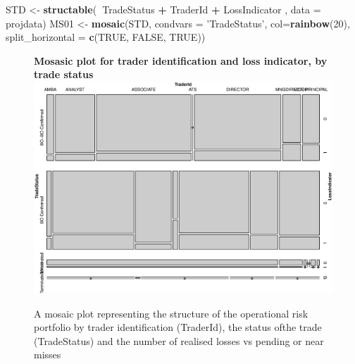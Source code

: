\documentclass[]{article}
\newenvironment{Shaded}{\begin{snugshade}}{\end{snugshade}}
\newcommand{\KeywordTok}[1]{\textcolor[rgb]{0.13,0.29,0.53}{\textbf{#1}}}
\newcommand{\DataTypeTok}[1]{\textcolor[rgb]{0.13,0.29,0.53}{#1}}
\newcommand{\DecValTok}[1]{\textcolor[rgb]{0.00,0.00,0.81}{#1}}
\newcommand{\StringTok}[1]{\textcolor[rgb]{0.31,0.60,0.02}{#1}}
\newcommand{\OtherTok}[1]{\textcolor[rgb]{0.56,0.35,0.01}{#1}}
\newcommand{\OperatorTok}[1]{\textcolor[rgb]{0.81,0.36,0.00}{\textbf{#1}}}
\newcommand{\NormalTok}[1]{#1}
\begin{document}
\begin{Shaded}
\begin{Highlighting}[]
\NormalTok{STD <-}\StringTok{ }\KeywordTok{structable}\NormalTok{(}\OperatorTok{~}\NormalTok{TradeStatus }\OperatorTok{+}\StringTok{ }\NormalTok{TraderId }\OperatorTok{+}\StringTok{ }\NormalTok{LossIndicator}
\NormalTok{                                        , }\DataTypeTok{data =}\NormalTok{ projdata)}
\NormalTok{MS01 <-}\StringTok{ }\KeywordTok{mosaic}\NormalTok{(STD, }\DataTypeTok{condvars =} \StringTok{'TradeStatus'}\NormalTok{, }\DataTypeTok{col=}\KeywordTok{rainbow}\NormalTok{(}\DecValTok{20}\NormalTok{),}
                  \DataTypeTok{split_horizontal =} \KeywordTok{c}\NormalTok{(}\OtherTok{TRUE}\NormalTok{, }\OtherTok{FALSE}\NormalTok{, }\OtherTok{TRUE}\NormalTok{))}
\end{Highlighting}
\end{Shaded}

\singlespacing

\begin{figure}
\centering
\textbf{Mosasic plot for trader identification and loss indicator, by trade status}
\includegraphics[width=\linewidth,height=0.75\linewidth]{Mosaic_Contingency.eps}
\caption[Portfolio structure by trader, trade status and number of realised losses]{A mosaic plot representing the structure of the operational risk portfolio by trader identification (TraderId), the status ofthe trade (TradeStatus) and the number of realised losses vs pending or near misses}
\label{Mosaic_Contingency}
\end{figure}

\doublespacing
\end{document}
